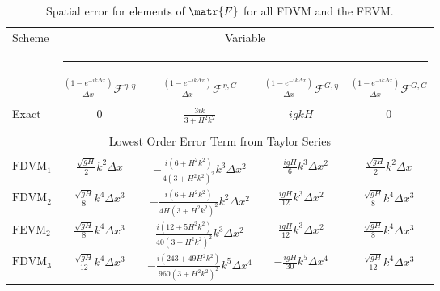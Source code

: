 %
\begin{table}
	\centering
	\begin{adjustbox}{}
		\begin{tabular}{l c c c c}
			Scheme &\multicolumn{4}{c}{Variable}\\
			&  \multicolumn{4}{l}{\rule{0.95\textwidth}{0.4pt}} \\
			& $\frac{\left(1 - e^{-ik\Delta x}\right)}{\Delta x}\mathcal{F}^{\eta,\eta}$& $\frac{\left(1 - e^{-ik\Delta x}\right)}{\Delta x} \mathcal{F}^{\eta,G}$& $ \frac{\left(1 - e^{-ik\Delta x}\right)}{\Delta x} \mathcal{F}^{G,\eta}$ & $\frac{\left(1 - e^{-ik\Delta x}\right)}{\Delta x} \mathcal{F}^{G,G}$ \\
			\hline \\
			Exact &  $0$& $\frac{3ik}{3 +H^2k^2}$ & ${igkH}$ & $0$\\
			\\ \hline \multicolumn{5}{c}{Lowest Order Error Term from Taylor Series} \\ \hline\\
			$\text{FDVM}_1$ & $\frac{\sqrt{gH}}{2}k^2 \Delta x$& $ -\frac{i\left(6 + H^2k^2\right)}{4 \left(3 + H^2k^2\right)^2} k^3 \Delta x^2$& $-\frac{igH}{6}k^3 \Delta x^2$&$\frac{\sqrt{gH}}{2}k^2 \Delta x$ \\ [5mm]
			$\text{FDVM}_2$ & $\frac{\sqrt{gH}}{8}k^4 \Delta x^3$& $-\frac{i\left(6 +H^2k^2\right)}{4H \left(3 + H^2k^2\right)^2}k^2 \Delta x^2$& $\frac{igH}{12}k^3 \Delta x^2$&$\frac{\sqrt{gH}}{8}k^4 \Delta x^3$ \\ [5mm]
			$\text{FEVM}_2$ & $\frac{\sqrt{gH}}{8}k^4 \Delta x^3$& $ \frac{i\left(12 + 5H^2k^2\right)}{40 \left(3 + H^2k^2\right)^2} k^3 \Delta x^2$& $\frac{igH}{12}k^3 \Delta x^2$&$\frac{\sqrt{gH}}{8}k^4 \Delta x^3$ \\ [5mm]
			$\text{FDVM}_3$ & $\frac{\sqrt{gH}}{12}k^4 \Delta x^3$& $ -\frac{i\left(243 + 49H^2k^2\right)}{960 \left(3 + H^2k^2\right)^2} k^5 \Delta x^4$& $-\frac{igH}{30}k^5 \Delta x^4$&$\frac{\sqrt{gH}}{12}k^4 \Delta x^3$ \\
		\end{tabular}
	\end{adjustbox}
	\caption{Spatial error for elements of $\matr{F}$ for all FDVM and the FEVM.}
	\label{tab:Ffactor}
\end{table}
%
